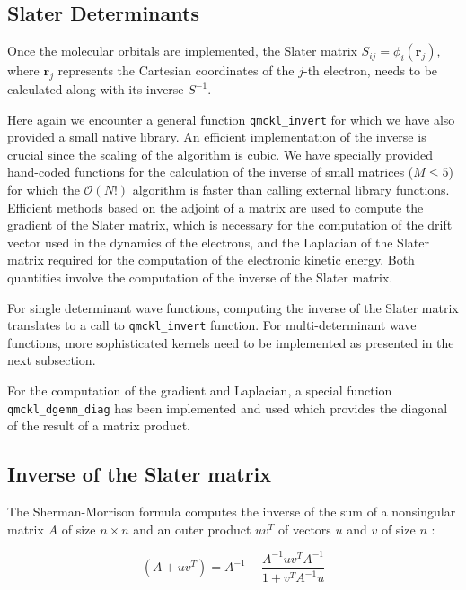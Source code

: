 \subsection{Slater Determinants}

Once the molecular orbitals are implemented, the Slater matrix $S_{ij} = \phi_i(\mathbf{r}_j)$,
where $\mathbf{r}_j$ represents the Cartesian coordinates of the $j$-th electron, needs to be
calculated along with its inverse $S^{-1}$.
  
Here again we encounter a general  function
\texttt{qmckl_invert} for which we have also provided a small native
library. An efficient implementation of the inverse is crucial since the 
scaling of the algorithm is cubic. We have specially provided hand-coded functions for
the calculation of the inverse of small matrices ($M\le 5$) for which the
$\mathcal{O}(N!)$ algorithm is faster than calling external library functions.
Efficient methods based on the adjoint of a matrix \cite{MCMQC} are used to
compute the gradient of the Slater matrix, which is necessary for the 
computation of the drift vector used in the dynamics of the
electrons, and the Laplacian of the Slater matrix required for the computation of
the electronic kinetic energy. Both quantities involve the computation of
the inverse of the Slater matrix.

For single determinant wave functions, computing the inverse of the Slater
matrix translates to a call to \texttt{qmckl_invert} function. For
multi-determinant wave functions, more sophisticated kernels need to be
implemented as presented in the next subsection.

For the computation of the gradient and Laplacian, a special function
\texttt{qmckl_dgemm_diag} has been implemented and used which provides
the diagonal of the result of a matrix product. 

\subsection{Inverse of the Slater matrix}

The Sherman-Morrison formula computes the inverse of the sum of a
nonsingular matrix $A$ of size $n \times n$ and an outer product
$uv^T$ of vectors $u$ and $v$ of size $n$ :

\begin{equation}
    (A + uv^T) = A^{-1} - \frac{A^{-1} uv^T A^{-1}}{1 + v^T A^{-1} u}
    \label{eq:sherman}
\end{equation}

